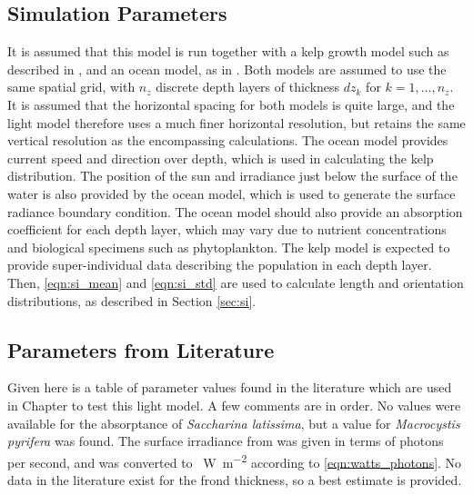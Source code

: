 \subsection{Simulation Parameters}
It is assumed that this model is run together with a kelp growth model such as described in \citep{broch_modelling_2012}, and an ocean model, as in \citep{wassmann_modelling_2006}.
Both models are assumed to use the same spatial grid, with $n_z$ discrete depth layers of thickness $dz_k$ for $k=1,\ldots,n_z$.
It is assumed that the horizontal spacing for both models is quite large, and the light model therefore uses a much finer horizontal resolution,
but retains the same vertical resolution as the encompassing calculations.
The ocean model provides current speed and direction over depth, which is used in calculating the kelp distribution.
The position of the sun and irradiance just below the surface of the water is also provided by the ocean model, which is used to generate the surface radiance boundary condition.
The ocean model should also provide an absorption coefficient for each depth layer, which may vary due to nutrient concentrations and biological specimens such as phytoplankton.
The kelp model is expected to provide super-individual data describing the population in each depth layer.
Then, \eqref{eqn:si_mean} and \eqref{eqn:si_std} are used to calculate length and orientation distributions, as described in Section \ref{sec:si}.

\subsection{Parameters from Literature}
Given here is a table of parameter values found in the literature which are used in Chapter \Rom{\ref{chap:model_analysis}} to test this light model.
A few comments are in order.
No values were available for the absorptance of \textit{Saccharina latissima}, but a value for \textit{Macrocystis pyrifera} was found.
The surface irradiance from \cite{broch_modelling_2012} was given in terms of photons per second,
and was converted to \SI{}{\W\per\m\squared} according to \eqref{eqn:watts_photons}.
No data in the literature exist for the frond thickness, so a best estimate is provided.

